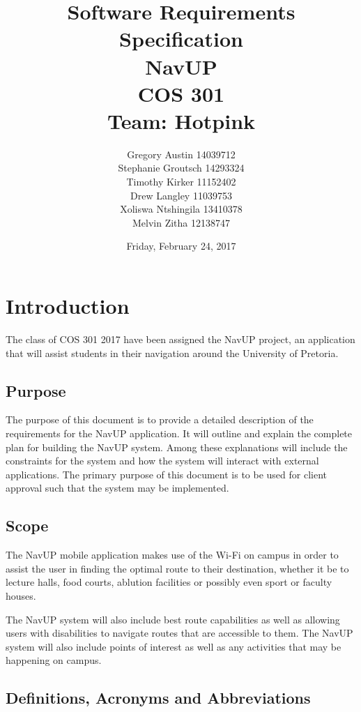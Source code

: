 \documentclass[12pt,a4paper]{report}
\title{Software Requirements Specification \\ NavUP \\ COS 301 \\ Team: Hotpink}
\date{Friday, February 24, 2017}
\author{Gregory Austin 14039712 \\ Stephanie Groutsch 14293324 \\ Timothy Kirker 11152402 \\ Drew Langley 11039753 \\ Xoliswa Ntshingila 13410378 \\ Melvin Zitha 12138747}
\begin{document}
\maketitle



\newpage
 \section*{Introduction}
The class of COS 301 2017 have been assigned the NavUP project, an application that will assist students in their navigation around the University of Pretoria.

	\subsection*{Purpose}
	The purpose of this document is to provide a detailed description of the requirements for the NavUP application. It will outline and explain the complete plan for building the NavUP system. 
	Among these explanations will include the constraints for the system and how the system will interact with external applications. The primary purpose of this document is to be used for client approval such that the system may be implemented.

		
	\subsection*{Scope}
	The NavUP mobile application makes use of the Wi-Fi on campus in order to assist the user in finding the optimal route to their destination, whether it be to lecture halls, food courts, ablution facilities or possibly even sport or faculty houses.

	The NavUP system will also include best route capabilities as well as allowing users with disabilities to navigate routes that are accessible to them. The NavUP system will also include points of interest as well as any activities that may be happening on campus.
	
		
	\subsection*{Definitions, Acronyms and Abbreviations}
	
\end{document}
